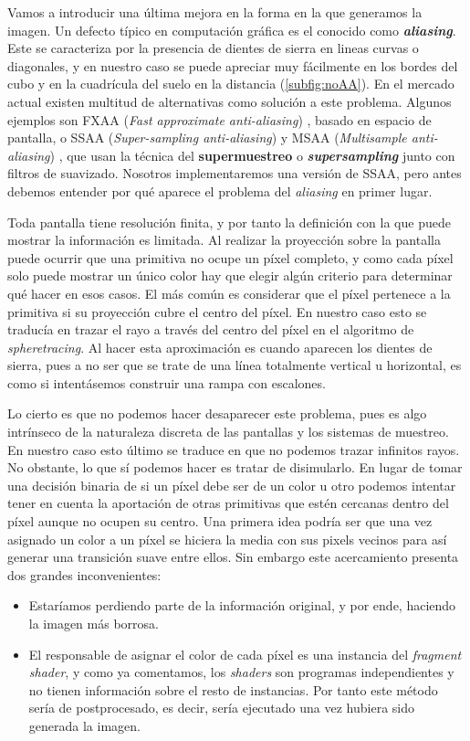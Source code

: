 Vamos a introducir una última mejora en la forma en la que generamos la imagen. Un defecto típico en computación gráfica es el conocido como \textbf{\textit{aliasing}}. Este se caracteriza por la presencia de dientes de sierra en lineas curvas o diagonales, y en nuestro caso se puede apreciar muy fácilmente en los bordes del cubo y en la cuadrícula del suelo en la distancia (\autoref{subfig:noAA}). En el mercado actual existen multitud de alternativas como solución a este problema. Algunos ejemplos son FXAA (\textit{Fast approximate anti-aliasing}) \cite{fxaa}, basado en espacio de pantalla, o SSAA (\textit{Super-sampling anti-aliasing}) \cite{ssaa} y MSAA (\textit{Multisample anti-aliasing}) \cite{msaa}, que usan la técnica del \textbf{supermuestreo} o \textbf{\textit{supersampling}} junto con filtros de suavizado. Nosotros implementaremos una versión de SSAA, pero antes debemos entender por qué aparece el problema del \textit{aliasing} en primer lugar.\newline

Toda pantalla tiene resolución finita, y por tanto la definición con la que puede mostrar la información es limitada. Al realizar la proyección sobre la pantalla puede ocurrir que una primitiva no ocupe un píxel completo, y como cada píxel solo puede mostrar un único color hay que elegir algún criterio para determinar qué hacer en esos casos. El más común es considerar que el píxel pertenece a la primitiva si su proyección cubre el centro del píxel. En nuestro caso esto se traducía en trazar el rayo a través del centro del píxel en el algoritmo de \textit{spheretracing}. Al hacer esta aproximación es cuando aparecen los dientes de sierra, pues a no ser que se trate de una línea totalmente vertical u horizontal, es como si intentásemos construir una rampa con escalones.\newline

Lo cierto es que no podemos hacer desaparecer este problema, pues es algo intrínseco de la naturaleza discreta de las pantallas y los sistemas de muestreo. En nuestro caso esto último se traduce en que no podemos trazar infinitos rayos. No obstante, lo que sí podemos hacer es tratar de disimularlo. En lugar de tomar una decisión binaria de si un píxel debe ser de un color u otro podemos intentar tener en cuenta la aportación de otras primitivas que estén cercanas dentro del píxel aunque no ocupen su centro. Una primera idea podría ser que una vez asignado un color a un píxel se hiciera la media con sus pixels vecinos para así generar una transición suave entre ellos. Sin embargo este acercamiento presenta dos grandes inconvenientes:
\begin{itemize}
    \item Estaríamos perdiendo parte de la información original, y por ende, haciendo la imagen más borrosa.
    \item El responsable de asignar el color de cada píxel es una instancia del \textit{fragment shader}, y como ya comentamos, los \textit{shaders} son programas independientes y no tienen información sobre el resto de instancias. Por tanto este método sería de postprocesado, es decir, sería ejecutado una vez hubiera sido generada la imagen.
    
\end{itemize}


